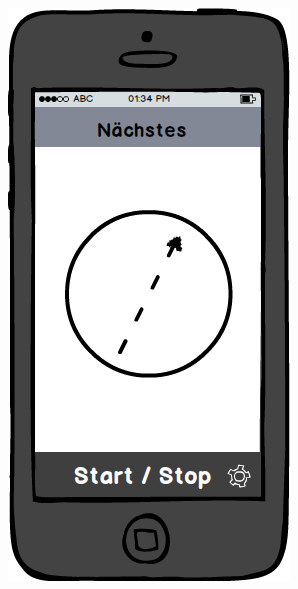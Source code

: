 \begin{figure}[h]
\centering
\begin{minipage}{.5\textwidth}
  \centering
  \includegraphics[width=.8\linewidth]{img/navigation-mockup.png}
  \label{img:navigation-mockup}
\end{minipage}%
\begin{minipage}{.5\textwidth}
  \centering

\end{minipage}
\end{figure}
